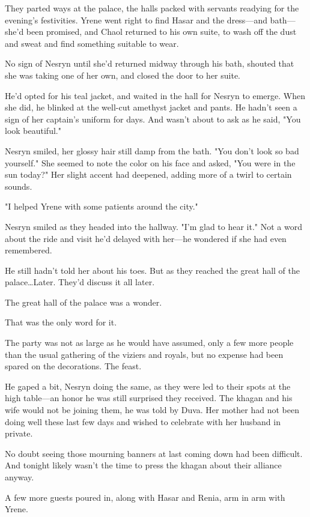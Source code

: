 They parted ways at the palace, the halls packed with servants readying for the evening's festivities.
Yrene went right to find Hasar and the dress---and bath--- she'd been promised, and Chaol returned to his own suite, to wash off the dust and sweat and find something suitable to wear.

No sign of Nesryn until she'd returned midway through his bath, shouted that she was taking one of her own, and closed the door to her suite.

He'd opted for his teal jacket, and waited in the hall for Nesryn to emerge.
When she did, he blinked at the well-cut amethyst jacket and pants.
He hadn't seen a sign of her captain's uniform for days.
And wasn't about to ask as he said, "You look beautiful."

Nesryn smiled, her glossy hair still damp from the bath.
"You don't look so bad yourself."
She seemed to note the color on his face and asked, "You were in the sun today?"
Her slight accent had deepened, adding more of a twirl to certain sounds.

"I helped Yrene with some patients around the city."

Nesryn smiled as they headed into the hallway.
"I'm glad to hear it."
Not a word about the ride and visit he'd delayed with her---he wondered if she had even remembered.

He still hadn't told her about his toes.
But as they reached the great hall of the palace\ldots Later.
They'd discuss it all later.

The great hall of the palace was a wonder.

That was the only word for it.

The party was not as large as he would have assumed, only a few more people than the usual gathering of the viziers and royals, but no expense had been spared on the decorations.
The feast.

He gaped a bit, Nesryn doing the same, as they were led to their spots at the high table---an honor he was still surprised they received.
The khagan and his wife would not be joining them, he was told by Duva.
Her mother had not been doing well these last few days and wished to celebrate with her husband in private.

No doubt seeing those mourning banners at last coming down had been difficult.
And tonight likely wasn't the time to press the khagan about their alliance anyway.

A few more guests poured in, along with Hasar and Renia, arm in arm with Yrene.

